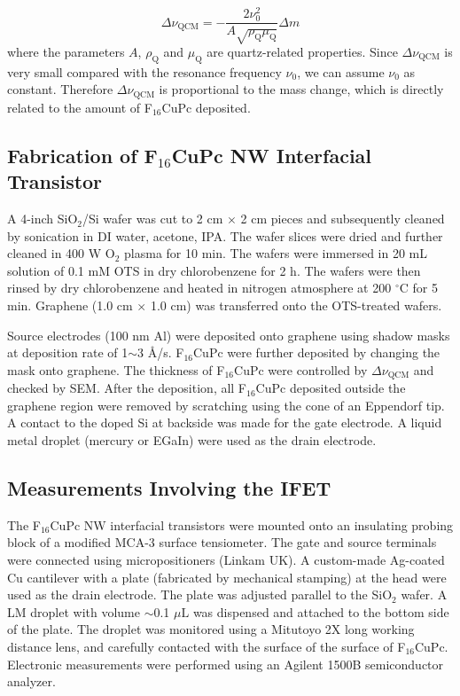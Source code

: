 \begin{equation}
\label{eq:small-1}
\Delta \nu_{\mathrm{QCM}} = -\frac{2 \nu_{0}^{2}}{A \sqrt{\rho_{\mathrm{Q}} \mu_{\mathrm{Q}}}} \Delta m
\end{equation}
where the parameters \(A\), \(\rho_{\mathrm{Q}}\) and \(\mu_{\mathrm{Q}}\)
are quartz-related properties. Since \(\Delta \nu_{\mathrm{QCM}}\) is very
small compared with the resonance frequency \(\nu_{0}\), we can assume
\(\nu_{0}\) as constant. Therefore \(\Delta \nu_{\mathrm{QCM}}\) is
proportional to the mass change, which is directly related to the
amount of F\(_{\text{16}}\)CuPc deposited.

\subsection{Fabrication of F\(_{\text{16}}\)CuPc NW Interfacial Transistor}
\label{sec:small-orgdb060bd}

A 4-inch SiO\(_{\text{2}}\)/Si wafer was cut to 2 cm \(\times\) 2 cm pieces and subsequently
cleaned by sonication in DI water, acetone, IPA. The wafer slices were dried
and further cleaned in 400 W O\(_{\text{2}}\) plasma for 10 min. The wafers were
immersed in 20 mL solution of 0.1 mM OTS in dry chlorobenzene for 2
h. The wafers were then rinsed by dry chlorobenzene and heated in
nitrogen atmosphere at 200 \(^{\circ}\mathrm{C}\) for 5 min. Graphene
(1.0 cm \(\times\) 1.0 cm) was transferred onto the OTS-treated wafers.

Source electrodes (100 nm Al) were deposited onto graphene using
shadow masks at deposition rate of 1\(\sim\)3 \AA{}/s. F\(_{\text{16}}\)CuPc were further
deposited by changing the mask onto graphene. The thickness of
F\(_{\text{16}}\)CuPc were controlled by \(\Delta \nu_{\mathrm{QCM}}\) and checked by
SEM. After the deposition, all F\(_{\text{16}}\)CuPc deposited outside the
graphene region were removed by scratching using the cone of an
Eppendorf tip. A contact to the doped Si at backside was made for the
gate electrode. A liquid metal droplet (mercury or EGaIn) were used as
the drain electrode.

\subsection*{Measurements Involving the IFET}
\label{sec:small-orgec772cc}

The F\(_{\text{16}}\)CuPc NW interfacial transistors were mounted onto an
insulating probing block of a modified MCA-3 surface tensiometer. The
gate and source terminals were connected using micropositioners
(Linkam UK). A custom-made Ag-coated Cu cantilever with a plate
(fabricated by mechanical stamping) at the head were used as the drain
electrode. The plate was adjusted parallel to the SiO\(_{\text{2}}\) wafer. A LM
droplet with volume \(\sim\)0.1 \(\mu \mathrm{L}\) was dispensed and
attached to the bottom side of the plate. The droplet was monitored
using a Mitutoyo 2X long working distance lens, and carefully
contacted with the surface of the surface of F\(_{\text{16}}\)CuPc. Electronic
measurements were performed using an Agilent 1500B semiconductor
analyzer.

